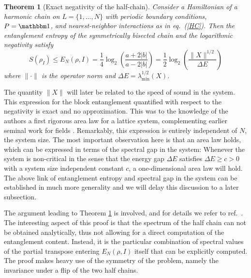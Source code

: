 \documentclass[12pt, rmp,floatfix,epsfig,graphics]{revtex4} %
\newtheorem{theorem}{Theorem}
\begin{document}
\begin{theorem}[Exact negativity of the half-chain]
\label{T1}
        Consider a Hamiltonian of a harmonic chain on 
        $L=\{1,\dots, N\}$ with
        periodic boundary conditions, $P=\id$, and nearest-neighbor 
        interactions as in eq.\  (\ref{HC}).
        Then the entanglement entropy of the symmetrically
        bisected chain and the logarithmic negativity satisfy
        \begin{equation}\label{halfent}
                S(\rho_I)\leq E_{N}(\rho,I) = \frac{1}{4}\log_2 
                \left(
                \frac{a+2|b|}{a-2|b|}
                \right)
                = \frac{1}{2}\log_2 
                \left(
                \frac{ \|X\|^{1/2}}{\Delta E}
                \right)
        \end{equation}
where $\|\cdot \|$ is the operator norm and 
$\Delta E = \lambda^{1/2}_{\text{min}}(X)$.      
\end{theorem}

The quantity $\|X\|$ will later be related to the speed of sound 
in the system. This expression for the block entanglement quantified 
with respect to the negativity is exact and no approximation. This 
was to the knowledge of the authors a first rigorous area law for 
a lattice system, complementing earlier seminal work for fields \cite{Callan}. 
Remarkably, this expression is entirely independent 
of $N$, the system size. The most important observation here is 
that an area law holds, which can be expressed in terms of the
spectral gap in the system: Whenever the system is 
non-critical in the sense that the energy gap $\Delta E$ satisfies
$\Delta E \ge c > 0$ with a system size independent constant $c$, 
a one-dimensional area law will hold.
%
The above link of entanglement entropy and spectral
gap in the system can be established in much more generality 
and we will delay this discussion to a later subsection. 

The argument leading to Theorem \ref{T1} is involved, and for 
details we refer to ref.\ \cite{Harmonic}. The  interesting 
aspect of this proof is that the spectrum of the half chain 
can not be obtained analytically, thus not allowing for a 
direct computation of the entanglement content. Instead, it 
is the particular combination of spectral values of the 
partial transpose entering $E_{N}(\rho,I)$ itself that can be 
explicitly computed. The proof makes heavy use of the symmetry 
of the problem, namely the invariance under a flip of the two 
half chains. 
\end{document}
